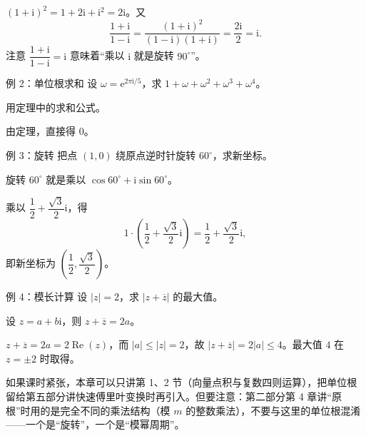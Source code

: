 \sol $(1+\mathrm i)^2=1+2\mathrm i+\mathrm i^2=2\mathrm i$。又
\[
\frac{1+\mathrm i}{1-\mathrm i}=\frac{(1+\mathrm i)^2}{(1-\mathrm i)(1+\mathrm i)}=\frac{2\mathrm i}{2}=\mathrm i.
\]
注意 $\dfrac{1+\mathrm i}{1-\mathrm i}=\mathrm i$ 意味着“乘以 $\mathrm i$ 就是旋转 $90^\circ$”。

\begin{problem}{例 2：单位根求和}
设 $\omega=\mathrm e^{2\pi\mathrm i/5}$，求 $1+\omega+\omega^2+\omega^3+\omega^4$。
\end{problem}
\hint 用定理中的求和公式。

\sol 由定理，直接得 $0$。

\begin{problem}{例 3：旋转}
把点 $(1,0)$ 绕原点逆时针旋转 $60^\circ$，求新坐标。
\end{problem}
\hint 旋转 $60^\circ$ 就是乘以 $\cos60^\circ+\mathrm i\sin60^\circ$。

\sol 乘以 $\dfrac12+\dfrac{\sqrt3}{2}\mathrm i$，得
\[
1\cdot\left(\frac12+\frac{\sqrt3}{2}\mathrm i\right)=\frac12+\frac{\sqrt3}{2}\mathrm i,
\]
即新坐标为 $\left(\dfrac12,\dfrac{\sqrt3}{2}\right)$。

\begin{problem}{例 4：模长计算}
设 $|z|=2$，求 $|z+\overline z|$ 的最大值。
\end{problem}
\hint 设 $z=a+b\mathrm i$，则 $z+\overline z=2a$。

\sol $z+\overline z=2a=2\operatorname{Re}(z)$，而 $|a|\le|z|=2$，故 $|z+\overline z|=2|a|\le4$。最大值 $4$ 在 $z=\pm2$ 时取得。

\begin{teach}[复数章的取舍建议]
如果课时紧张，本章可以只讲第 1、2 节（向量点积与复数四则运算），把单位根留给第五部分讲快速傅里叶变换时再引入。但要注意：第二部分第 4 章讲“原根”时用的是完全不同的乘法结构（模 $m$ 的整数乘法），不要与这里的单位根混淆——一个是“旋转”，一个是“模幂周期”。
\end{teach}
